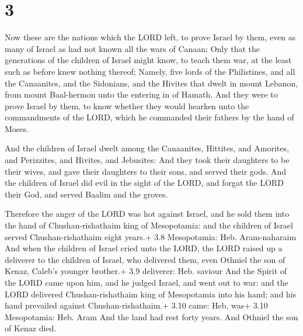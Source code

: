 \hypertarget{section-2}{%
\section{3}\label{section-2}}

 Now these are the nations which the LORD left, to prove
Israel by them, even as many of Israel as had not known all the wars of
Canaan;  Only that the generations of the children of Israel
might know, to teach them war, at the least such as before knew nothing
thereof;  Namely, five lords of the Philistines, and all the
Canaanites, and the Sidonians, and the Hivites that dwelt in mount
Lebanon, from mount Baal-hermon unto the entering in of Hamath.
 And they were to prove Israel by them, to know whether they
would hearken unto the commandments of the LORD, which he commanded
their fathers by the hand of Moses.

 And the children of Israel dwelt among the Canaanites,
Hittites, and Amorites, and Perizzites, and Hivites, and Jebusites:
 And they took their daughters to be their wives, and gave
their daughters to their sons, and served their gods.  And
the children of Israel did evil in the sight of the LORD, and forgat the
LORD their God, and served Baalim and the groves.

 Therefore the anger of the LORD was hot against Israel,
and he sold them into the hand of Chushan-rishathaim king of
Mesopotamia: and the children of Israel served Chushan-rishathaim eight
years.+ 3.8 Mesopotamia: Heb. Aram-naharaim  And when the
children of Israel cried unto the LORD, the LORD raised up a deliverer
to the children of Israel, who delivered them, even Othniel the son of
Kenaz, Caleb's younger brother.+ 3.9 deliverer: Heb. saviour
 And the Spirit of the LORD came upon him, and he judged
Israel, and went out to war: and the LORD delivered Chushan-rishathaim
king of Mesopotamia into his hand; and his hand prevailed against
Chushan-rishathaim.+ 3.10 came: Heb. was+ 3.10 Mesopotamia: Heb. Aram
 And the land had rest forty years. And Othniel the son of
Kenaz died.

